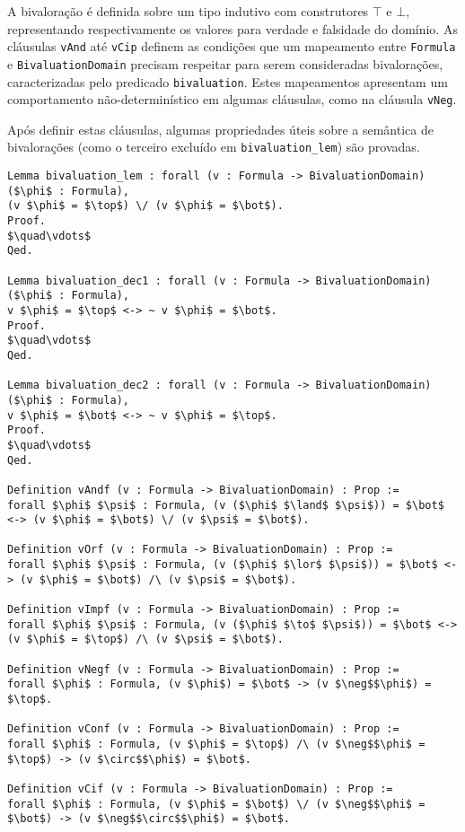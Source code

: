               A bivaloração é definida sobre um tipo indutivo com construtores $\top$ e $\bot$, representando respectivamente os valores para verdade e falsidade do domínio. As cláusulas \texttt{vAnd} até \texttt{vCip} definem as condições que um mapeamento entre \texttt{Formula} e \texttt{BivaluationDomain} precisam respeitar para serem consideradas bivalorações, caracterizadas pelo predicado \texttt{bivaluation}. Estes mapeamentos apresentam um comportamento não-determinístico em algumas cláusulas, como na cláusula \texttt{vNeg}.

              Após definir estas cláusulas, algumas propriedades úteis sobre a semântica de bivalorações (como o terceiro excluído em \texttt{bivaluation\_lem}) são provadas.

              \begin{lstlisting}[name=Semantics, frame=single, language=coq]
Lemma bivaluation_lem : forall (v : Formula -> BivaluationDomain) ($\phi$ : Formula),
(v $\phi$ = $\top$) \/ (v $\phi$ = $\bot$).
Proof.
$\quad\vdots$
Qed.

Lemma bivaluation_dec1 : forall (v : Formula -> BivaluationDomain) ($\phi$ : Formula),
v $\phi$ = $\top$ <-> ~ v $\phi$ = $\bot$.
Proof.
$\quad\vdots$
Qed.

Lemma bivaluation_dec2 : forall (v : Formula -> BivaluationDomain) ($\phi$ : Formula),
v $\phi$ = $\bot$ <-> ~ v $\phi$ = $\top$.
Proof.
$\quad\vdots$
Qed.

Definition vAndf (v : Formula -> BivaluationDomain) : Prop :=
forall $\phi$ $\psi$ : Formula, (v ($\phi$ $\land$ $\psi$)) = $\bot$ <-> (v $\phi$ = $\bot$) \/ (v $\psi$ = $\bot$).

Definition vOrf (v : Formula -> BivaluationDomain) : Prop :=
forall $\phi$ $\psi$ : Formula, (v ($\phi$ $\lor$ $\psi$)) = $\bot$ <-> (v $\phi$ = $\bot$) /\ (v $\psi$ = $\bot$).

Definition vImpf (v : Formula -> BivaluationDomain) : Prop :=
forall $\phi$ $\psi$ : Formula, (v ($\phi$ $\to$ $\psi$)) = $\bot$ <-> (v $\phi$ = $\top$) /\ (v $\psi$ = $\bot$).

Definition vNegf (v : Formula -> BivaluationDomain) : Prop :=
forall $\phi$ : Formula, (v $\phi$) = $\bot$ -> (v $\neg$$\phi$) = $\top$.

Definition vConf (v : Formula -> BivaluationDomain) : Prop :=
forall $\phi$ : Formula, (v $\phi$ = $\top$) /\ (v $\neg$$\phi$ = $\top$) -> (v $\circ$$\phi$) = $\bot$.

Definition vCif (v : Formula -> BivaluationDomain) : Prop :=
forall $\phi$ : Formula, (v $\phi$ = $\bot$) \/ (v $\neg$$\phi$ = $\bot$) -> (v $\neg$$\circ$$\phi$) = $\bot$.


\end{lstlisting}
